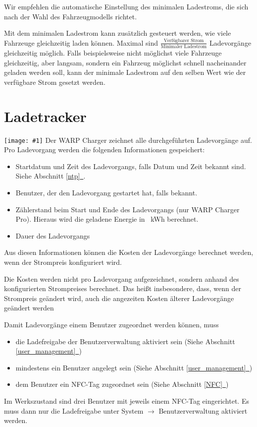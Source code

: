\documentclass[a4paper,10pt]{article}
\newcommand{\hint}[1]{\begin{tcolorbox}[colback=boxgray,colframe=black,coltext=
white,title=Hinweis,left*=2mm,right*=2mm,boxsep=1mm,bottom=1mm,top=1mm]#1\end{tcolorbox}}
\newcommand{\gfx}[1]{\texttt{[image: \#1]}}
\newcommand*{\fullref}[1]{Abschnitt \hyperref[{#1}]{\ref*{#1}~\nameref*{#1}}}
\begin{document}
\begin{multicols*}{2}
    \hint{Wir empfehlen die automatische Einstellung des minimalen Ladestroms, die sich nach der Wahl des Fahrzeugmodells richtet.}

    Mit dem minimalen Ladestrom kann zusätzlich gesteuert werden, wie viele Fahrzeuge gleichzeitig laden können.
    Maximal sind $\frac{\text{Verfügbarer Strom}}{\text{Minimaler Ladestrom}}$ Ladevorgänge gleichzeitig möglich. Falls beispielsweise nicht möglichst viele
    Fahrzeuge gleichzeitig, aber langsam, sondern ein Fahrzeug möglichst schnell nacheinander geladen werden soll, kann der minimale Ladestrom auf den selben Wert
    wie der verfügbare Strom gesetzt werden.

    \newpage
    \section{Ladetracker}\label{charge_tracker}
    \gfx{./img_warp2/resized/web_charge_tracker}
    Der WARP Charger zeichnet alle durchgeführten Ladevorgänge auf. Pro Ladevorgang werden die folgenden Informationen gespeichert:
    \begin{itemize}
     \item Startdatum und Zeit des Ladevorgangs, falls Datum und Zeit bekannt
     sind. Siehe \fullref{ntp}.
     \item Benutzer, der den Ladevorgang gestartet hat, falls bekannt.
     \item Zählerstand beim Start und Ende des Ladevorgangs (nur WARP Charger Pro). Hieraus wird die geladene Energie in \SI{}{\kWh} berechnet.
     \item Dauer des Ladevorgangs
    \end{itemize}
    Aus diesen Informationen können die Kosten der Ladevorgänge berechnet werden, wenn der Strompreis konfiguriert wird. \hint{Die Kosten werden nicht pro Ladevorgang aufgezeichnet, sondern anhand des konfigurierten Strompreises berechnet. Das heißt insbesondere, dass, wenn der Strompreis geändert wird, auch die angezeiten Kosten älterer Ladevorgänge geändert werden}

    \vfill
    \null
    \columnbreak

    \hint{Damit Ladevorgänge einem Benutzer zugeordnet werden können, muss
        \begin{itemize}
            \item die Lade­freigabe der Benutzerverwaltung aktiviert sein
            (Siehe \fullref{user_management})
            \item mindestens ein Benutzer angelegt sein (Siehe \fullref{user_management})
            \item dem Benutzer ein NFC-Tag zugeordnet sein (Siehe \fullref{NFC})
        \end{itemize}
        Im Werkszustand sind drei Benutzer mit jeweils einem NFC-Tag eingerichtet. Es muss dann nur die Lade­freigabe unter System $\rightarrow$  Benutzerverwaltung aktiviert werden.
    }


\end{multicols*}
\end{document}
